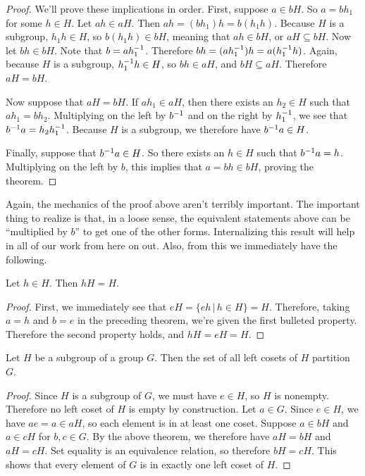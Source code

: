\begin{proof}

We'll prove these implications in order. First, suppose $a \in bH$. So $a = bh_1$ for some $h \in H$. Let $ah \in aH$. Then $ah = (bh_1)h = b(h_1 h)$. Because $H$ is a subgroup, $h_1 h \in H$, so $b(h_1 h) \in bH$, meaning that $ah \in bH$, or $aH \subseteq bH$. Now let $bh \in bH$. Note that $b = a h_1^{-1}$. Therefore $bh = (a h_1^{-1})h = a (h_1^{-1}h)$. Again, because $H$ is a subgroup, $h_1^{-1} h \in H$, so $bh \in aH$, and $bH \subseteq aH$. Therefore $aH = bH$.

Now suppose that $aH = bH$. If $ah_1 \in aH$, then there exists an $h_2 \in H$ such that $ah_1 = bh_2$. Multiplying on the left by $b^{-1}$ and on the right by $h_1^{-1}$, we see that $b^{-1}a = h_2 h_1^{-1}$. Because $H$ is a subgroup, we therefore have $b^{-1}a \in H$.

Finally, suppose that $b^{-1}a \in H$. So there exists an $h \in H$ such that $b^{-1}a = h$. Multiplying on the left by $b$, this implies that $a = bh \in bH$, proving the theorem.

\end{proof}

Again, the mechanics of the proof above aren't terribly important. The important thing to realize is that, in a loose sense, the equivalent statements above can be ``multiplied by $b$'' to get one of the other forms. Internalizing this result will help in all of our work from here on out. Also, from this we immediately have the following.

\begin{corollary}
\label{cosetcorollary}
Let $h \in H$. Then $hH = H$.
\end{corollary}

\begin{proof}
First, we immediately see that $eH = \{eh \,|\, h \in H\} = H$. Therefore, taking $a=h$ and $b=e$ in the preceding theorem, we're given the first bulleted property. Therefore the second property holds, and $hH = eH = H$.

\end{proof}

\begin{theorem}
\label{cosetpartition}
Let $H$ be a subgroup of a group $G$. Then the set of all left cosets of $H$ partition $G$.
\end{theorem}

\begin{proof}
Since $H$ is a subgroup of $G$, we must have $e \in H$, so $H$ is nonempty. Therefore no left coset of $H$ is empty by construction. Let $a \in G$. Since $e \in H$, we have $ae = a \in aH$, so each element is in at least one coset. Suppose $a \in bH$ and $a \in cH$ for $b, c \in G$. By the above theorem, we therefore have $aH = bH$ and $aH = cH$. Set equality is an equivalence relation, so therefore $bH = cH$. This shows that every element of $G$ is in exactly one left coset of $H$.

\end{proof}

